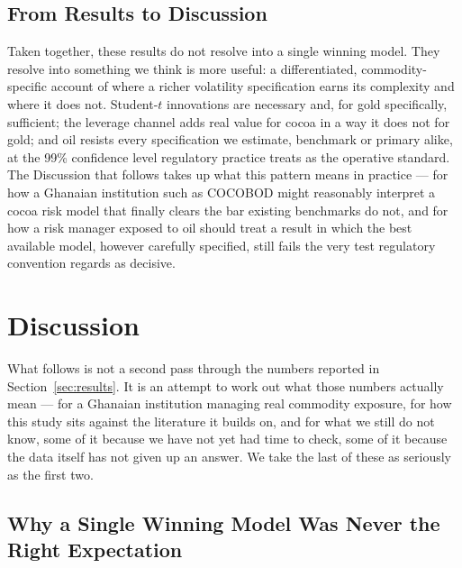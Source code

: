 \documentclass[preprint,12pt,authoryear]{elsarticle}
\begin{document}
\subsection{From Results to Discussion}

Taken together, these results do not resolve into a single winning model. They resolve into something we think is more useful: a differentiated, commodity-specific account of where a richer volatility specification earns its complexity and where it does not. Student-$t$ innovations are necessary and, for gold specifically, sufficient; the leverage channel adds real value for cocoa in a way it does not for gold; and oil resists every specification we estimate, benchmark or primary alike, at the 99\% confidence level regulatory practice treats as the operative standard. The Discussion that follows takes up what this pattern means in practice --- for how a Ghanaian institution such as COCOBOD might reasonably interpret a cocoa risk model that finally clears the bar existing benchmarks do not, and for how a risk manager exposed to oil should treat a result in which the best available model, however carefully specified, still fails the very test regulatory convention regards as decisive.

\section{Discussion}
\label{sec:discussion}

What follows is not a second pass through the numbers reported in Section~\ref{sec:results}. It is an attempt to work out what those numbers actually mean --- for a Ghanaian institution managing real commodity exposure, for how this study sits against the literature it builds on, and for what we still do not know, some of it because we have not yet had time to check, some of it because the data itself has not given up an answer. We take the last of these as seriously as the first two.

\subsection{Why a Single Winning Model Was Never the Right Expectation}
\end{document}
